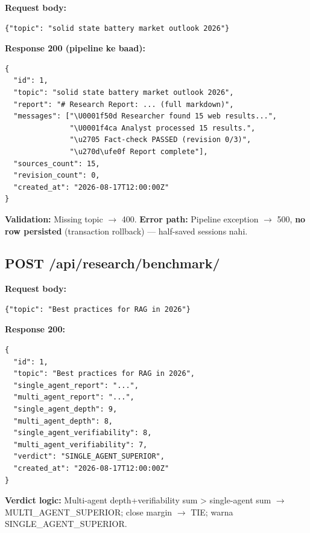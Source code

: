 \begin{codestorybox}
\textbf{Request body:}
\begin{lstlisting}[style=jsonstyle]
{"topic": "solid state battery market outlook 2026"}
\end{lstlisting}

\textbf{Response 200 (pipeline ke baad):}
\begin{lstlisting}[style=jsonstyle]
{
  "id": 1,
  "topic": "solid state battery market outlook 2026",
  "report": "# Research Report: ... (full markdown)",
  "messages": ["\U0001f50d Researcher found 15 web results...",
               "\U0001f4ca Analyst processed 15 results.",
               "\u2705 Fact-check PASSED (revision 0/3)",
               "\u270d\ufe0f Report complete"],
  "sources_count": 15,
  "revision_count": 0,
  "created_at": "2026-08-17T12:00:00Z"
}
\end{lstlisting}

\textbf{Validation:} Missing topic $\rightarrow$ 400. \textbf{Error path:} Pipeline exception $\rightarrow$ 500, \textbf{no row persisted} (transaction rollback) --- half-saved sessions nahi.
\end{codestorybox}

\subsection{POST /api/research/benchmark/}

\begin{codestorybox}
\textbf{Request body:}
\begin{lstlisting}[style=jsonstyle]
{"topic": "Best practices for RAG in 2026"}
\end{lstlisting}

\textbf{Response 200:}
\begin{lstlisting}[style=jsonstyle]
{
  "id": 1,
  "topic": "Best practices for RAG in 2026",
  "single_agent_report": "...",
  "multi_agent_report": "...",
  "single_agent_depth": 9,
  "multi_agent_depth": 8,
  "single_agent_verifiability": 8,
  "multi_agent_verifiability": 7,
  "verdict": "SINGLE_AGENT_SUPERIOR",
  "created_at": "2026-08-17T12:00:00Z"
}
\end{lstlisting}

\textbf{Verdict logic:} Multi-agent depth+verifiability sum > single-agent sum $\rightarrow$ MULTI\_AGENT\_SUPERIOR; close margin $\rightarrow$ TIE; warna SINGLE\_AGENT\_SUPERIOR.
\end{codestorybox}

